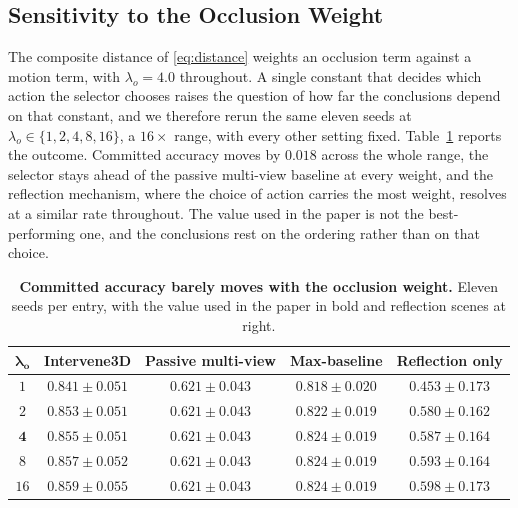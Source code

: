 \documentclass{article} %
\theoremstyle{defstyle}
\theoremstyle{plain}
\begin{document}
\subsection{Sensitivity to the Occlusion Weight}
\label{sec:supp-occlusion}

The composite distance of \eqref{eq:distance} weights an occlusion term against a motion
term, with $\lambda_o = 4.0$ throughout. A single constant that decides which action the
selector chooses raises the question of how far the conclusions depend on that constant, and
we therefore rerun the same eleven seeds at $\lambda_o \in \{1, 2, 4, 8, 16\}$, a $16\times$
range, with every other setting fixed. Table~\ref{tab:supp-occlusion} reports the outcome.
Committed accuracy moves by $0.018$ across the whole range, the selector stays ahead of the
passive multi-view baseline at every weight, and the reflection mechanism, where the choice
of action carries the most weight, resolves at a similar rate throughout. The value used in
the paper is not the best-performing one, and the conclusions rest on the ordering rather
than on that choice.

\begin{table}[!ht]
\caption{\textbf{Committed accuracy barely moves with the occlusion weight.} Eleven seeds per entry,
with the value used in the paper in bold and reflection scenes at right.}
\label{tab:supp-occlusion}
\begin{center}
\footnotesize
\begin{tabular}{ccccc}
\toprule
$\boldsymbol{\lambda_o}$ & \textbf{Intervene3D} & \textbf{Passive multi-view} &
\textbf{Max-baseline} & \textbf{Reflection only} \\
\midrule
$1$  & $0.841 \pm 0.051$ & $0.621 \pm 0.043$ & $0.818 \pm 0.020$ & $0.453 \pm 0.173$ \\
$2$  & $0.853 \pm 0.051$ & $0.621 \pm 0.043$ & $0.822 \pm 0.019$ & $0.580 \pm 0.162$ \\
$\mathbf{4}$ & $\mathbf{0.855 \pm 0.051}$ & $0.621 \pm 0.043$ & $0.824 \pm 0.019$ & $0.587 \pm 0.164$ \\
$8$  & $0.857 \pm 0.052$ & $0.621 \pm 0.043$ & $0.824 \pm 0.019$ & $0.593 \pm 0.164$ \\
$16$ & $0.859 \pm 0.055$ & $0.621 \pm 0.043$ & $0.824 \pm 0.019$ & $0.598 \pm 0.173$ \\
\bottomrule
\end{tabular}
\end{center}
\end{table}
\end{document}
